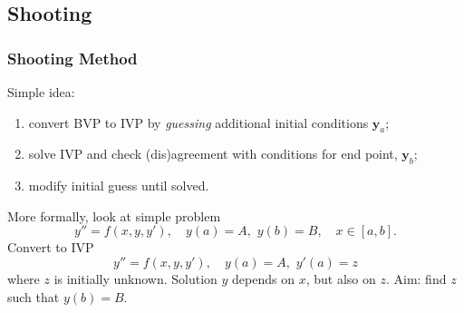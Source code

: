 \documentclass{beamer}
\newcommand{\by}{{\boldsymbol{y}}}
\begin{document}
\subsection{Shooting}




\begin{frame}
  \frametitle{Shooting Method}

  Simple idea:
  \begin{enumerate}
  \item convert BVP to IVP by \emph{guessing} additional initial
    conditions $\by_a$;
  \item solve IVP and check (dis)agreement with conditions for end
    point, $\by_b$;
  \item modify initial guess until solved.
  \end{enumerate} \pause

  \vspace{1ex}

  More formally, look at simple problem
  \begin{equation*}
    y'' = f(x, y, y'), \quad y(a) = A, \,\, y(b) = B, \quad x \in
    [a,b].
  \end{equation*} \pause
  Convert to IVP
  \begin{equation*}
    y'' = f(x, y, y'), \quad y(a) = A, \,\, y'(a) = z
  \end{equation*}
  where $z$ is initially unknown. \pause Solution $y$ depends on $x$,
  but also on $z$. Aim: find $z$ such that $y(b) = B$.

\end{frame}
\end{document}
